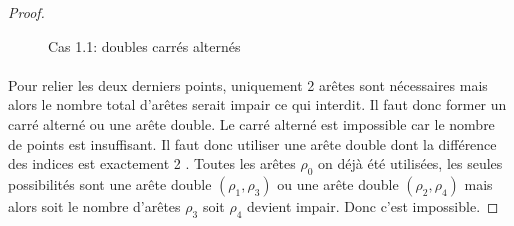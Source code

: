 \begin{proof}
  \begin{figure}[H]
    \begin{center}
      \caption{Cas 1.1: doubles carrés alternés}
    \end{center}
  \end{figure}

  \paragraph{}
  Pour relier les deux derniers points, uniquement 2 arêtes sont nécessaires mais alors le nombre total d'arêtes serait impair ce qui interdit. Il faut donc former un carré alterné ou une arête double. Le carré alterné est impossible car le nombre de points est insuffisant. Il faut donc utiliser une arête double dont la différence des indices est exactement 2 . Toutes les arêtes $\rho_0$ on déjà été utilisées, les seules possibilités sont une arête double $(\rho_1,\rho_3)$ ou une arête double $(\rho_2,\rho_4)$ mais alors soit le nombre d'arêtes $\rho_3$ soit $\rho_4$ devient impair. Donc c'est impossible.
\end{proof}

